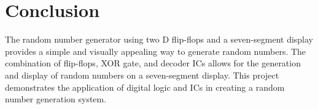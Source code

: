 \documentclass[journal,12pt,twocolumn]{IEEEtran}
\begin{document}
\section{Conclusion}
The random number generator using two D flip-flops and a seven-segment display provides a simple and visually appealing way to generate random numbers. The combination of flip-flops, XOR gate, and decoder ICs allows for the generation and display of random numbers on a seven-segment display. This project demonstrates the application of digital logic and ICs in creating a random number generation system.
\end{document}
